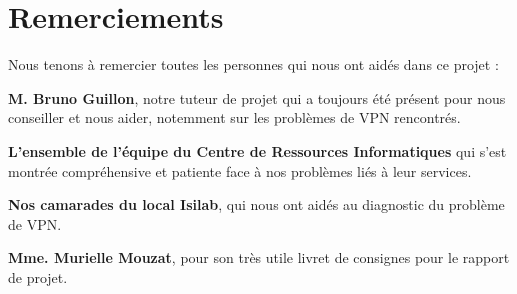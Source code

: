 \section{Remerciements}

Nous tenons à remercier toutes les personnes qui nous ont aidés dans ce projet :

\textbf{M. Bruno Guillon}, notre tuteur de projet qui a toujours été présent pour nous conseiller et nous aider, notemment sur les problèmes de VPN
rencontrés.

\textbf{L'ensemble de l'équipe du Centre de Ressources Informatiques} qui s'est montrée compréhensive et patiente face à nos problèmes liés à leur
services.

\textbf{Nos camarades du local Isilab}, qui nous ont aidés au diagnostic du problème de VPN.

\textbf{Mme. Murielle Mouzat}, pour son très utile livret de consignes pour le rapport de projet.